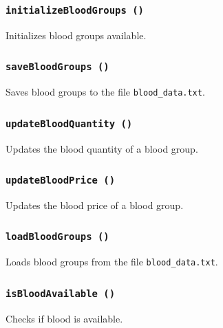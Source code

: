 \documentclass[12pt,a4paper]{report}
\begin{document}
\subsubsection{\texttt{initializeBloodGroups ()}}
Initializes blood groups available.


\subsubsection{\texttt{saveBloodGroups ()}}
Saves blood groups to the file \texttt{blood\_data.txt}.


\subsubsection{\texttt{updateBloodQuantity ()}}
Updates the blood quantity of a blood group.


\subsubsection{\texttt{updateBloodPrice ()}}
Updates the blood price of a blood group.


\subsubsection{\texttt{loadBloodGroups ()}}
Loads blood groups from the file \texttt{blood\_data.txt}.


\subsubsection{\texttt{isBloodAvailable ()}}
Checks if blood is available.

\end{document}
